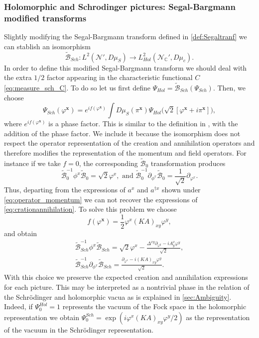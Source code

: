 \documentclass[12pt]{article}%
\begin{document}
\subsubsection{ Holomorphic and Schrodinger pictures: Segal-Bargmann modified transforms}
Slightly modifying the Segal-Bargmann transform defined in \autoref{def:Segaltranf} we can stablish an isomorphism $$\tilde{\mathcal{B}}_{Sch}:L^2(\mathcal{N}',D\mu_S)\to L^2_{Hol}(\mathcal{N}_{\mathbb{C}}', D\mu_c).$$  
In order to define this modified Segal-Bargmann transform we should deal with the extra $1/2$ factor appearing in the characteristic functional $C$ \eqref{eq:measure_sch_C}. To do so let us first define $\Psi_{Hol}=\tilde{\mathcal{B}}_{Sch}(\Psi_{Sch})$. Then, we choose
\begin{equation}
    \label{eq:segalBargmanntransform}
    \Psi_{Sch}(\varphi^{\mathbf{x}})=e^{{i}f(\varphi^\mathbf{x})}\int D\mu_S(\pi^{\mathbf{x}})\Psi_{Hol}\big(\sqrt{2}[\varphi^{\mathbf{x}}+i\pi^{\mathbf{x}}]\big),
\end{equation}
where $e^{if(\varphi^\mathbf{x})}$ is a phase factor. This is similar to the definition in \cite{Oeckl2012},  with the addition of the phase factor. We include it because the isomorphism does not respect the operator representation of the creation and annihilation operators and therefore modifies the representation of the momentum and field operators. For instance if we take $f=0$, the corresponding $\tilde{\mathcal{B}}_{0}$ transformation produces
$$\tilde{\mathcal{B}}_{0}^{-1}\phi^x \tilde{\mathcal{B}}_{0}=\sqrt{2}\varphi^x,\textrm{ and }\tilde{\mathcal{B}}_{0}^{-1}\partial_{\phi^x} \tilde{\mathcal{B}}_{0}= \frac{1}{\sqrt2}\partial_{\varphi^x}. $$
Thus, departing from the expressions of $a^x$ and $a^{\dagger x}$ shown under \eqref{eq:operator_momentum}  we can not recover the expressions of \eqref{eq:crationannihilation}. To solve this problem we choose $$ f(\varphi^\mathbf{x})=\frac{1}2\varphi^x(KA)_{xy}\varphi^y,$$ and obtain
\begin{gather}
\label{eq:beggman_seagal_sch_creat_anhil}
\tilde{\mathcal{B}}_{Sch}^{-1}\phi^x \tilde{\mathcal{B}}_{Sch}=\sqrt2\varphi^x-\frac{\Delta^{xy}\partial_{\varphi^y}-iA^x_{
    y}\varphi^y}{\sqrt 2},\nonumber\\ \tilde{\mathcal{B}}_{Sch}^{-1}\partial_{\phi^x} \tilde{\mathcal{B}}_{Sch}= \frac{\partial_{\varphi^x}-i(KA)_{x
y}\varphi^y}{\sqrt 2}.
\end{gather} 
With this choice we preserve the expected creation and annihilation expressions for each picture. This may be interpreted as a nontrivial phase in the relation of the Schrödinger and holomorphic vacua as is explained in \autoref{sec:Ambiguity}. Indeed, if $\Psi_0^{Hol}=1$ represents the vacuum of the Fock space in the holomorphic representation we obtain $\Psi^{Sch}_0=\exp(i\varphi^x(KA)_{xy}\varphi^y/2)$ as the representation of the vacuum in the Schrödinger representation.
\end{document}
